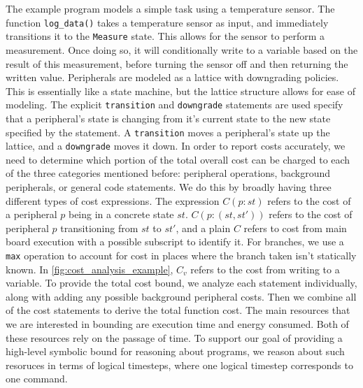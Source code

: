 The example program models a simple task using a temperature sensor. The function \texttt{log\_data()} takes a temperature sensor as input, and immediately transitions it to the \texttt{Measure} state. This allows for the sensor to perform a measurement. Once doing so, it will conditionally write to a variable based on the result of this measurement, before turning the sensor off and then returning the written value. Peripherals are modeled as a lattice with downgrading policies. This is essentially like a state machine, but the lattice structure allows for ease of modeling. The explicit 
\texttt{transition} and \texttt{downgrade} statements are used specify that a peripheral's state is changing from it's current state to the new state specified by the statement. A \texttt{transition} moves a peripheral's state up the lattice, and a \texttt{downgrade} moves it down. In order to report costs accurately, we need to determine which portion of the total overall cost can be charged to each of the three categories mentioned before: peripheral operations, background peripherals, or general code statements. We do this by broadly having three different types of cost expressions. The expression $C(p : st)$ refers to the cost of a peripheral $p$ being in a concrete state $st$. $C(p : (st, st'))$ refers to the cost of peripheral $p$ transitioning from $st$ to $st'$, and a plain $C$ refers to cost from main board execution with a possible subscript to identify it. For branches, we use a \texttt{max} operation to account for cost in places where the branch taken isn't statically known. In \autoref{fig:cost_analysis_example},  $C_v$ refers to the cost from writing to a variable. To provide the total cost bound, we analyze each statement individually, along with adding any possible background peripheral costs. Then we combine all of the cost statements to derive the total function cost. The main resources that we are interested in bounding are execution time and energy consumed. Both of these resources rely on the passage of time. To support our goal of providing a high-level symbolic bound for reasoning about programs, we reason about such resoruces in terms of logical timesteps, where one logical timestep corresponds to one command. 

